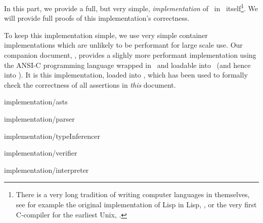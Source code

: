 

In this part, we provide a full, but very simple, \emph{implementation} of 
\joylol\ in \joylol\ itself\footnote{There is a very long tradition of 
writing computer languages in themselves, see for example the original 
implementation of Lisp in Lisp, 
\cite{mcCarthyAbrahamsEdwardsHartLevin1965lispManual}, or the very first 
C-compiler for the earliest Unix, \cite{??}.}. We will provide full proofs 
of this implementation's correctness. 

To keep this implementation simple, we use very simple container 
implementations which are unlikely to be performant for large scale use. 
Our companion document, \cite{gaito2017joyLoLImplementation}, provides a 
slighly more performant implementation using the ANSI-C programming 
language wrapped in \Lua\ and loadable into \luaTeX\ (and hence into 
\ConTeXt). It is this implementation, loaded into \ConTeXt, which has been 
used to formally check the correctness of all assertions in \emph{this} 
document. 

\component implementation/asts

\component implementation/parser

\component implementation/typeInferencer

\component implementation/verifier

\component implementation/interpreter

